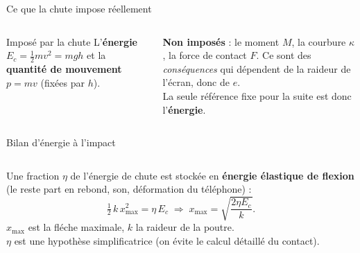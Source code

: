 \documentclass[11pt,aspectratio=169]{beamer}
\begin{document}
\begin{frame}{Ce que la chute impose réellement}
  \begin{columns}[c]
    \centering
    \footnotesize
    \begin{block}{Imposé par la chute}
    L'\textbf{énergie} $E_c=\tfrac12 mv^{2}=mgh$ et la \textbf{quantité de
    mouvement} $p=mv$ (fixées par $h$).
    \end{block}
    \textbf{Non imposés} : le moment $M$, la courbure $\kappa$, la force de
    contact $F$. Ce sont des \emph{conséquences} qui dépendent de la raideur de
    l'écran, donc de $e$.
    \medskip\\
    \textcolor{danger}{La seule référence fixe pour la suite est donc
    l'\textbf{énergie}.}
  \end{columns}
\end{frame}

\begin{frame}{Bilan d'énergie à l'impact}
  \begin{columns}[c]
    \centering
    \footnotesize
    Une fraction $\eta$ de l'énergie de chute est stockée en \textbf{énergie
    élastique de flexion} (le reste part en rebond, son, déformation du
    téléphone) :
    \[ \tfrac12\,k\,x_{\max}^{2}=\eta\,E_c
       \;\Rightarrow\; x_{\max}=\sqrt{\frac{2\eta E_c}{k}} . \]
    $x_{\max}$ est la fléche maximale, $k$ la raideur de la poutre.
    \medskip\\
    \textcolor{danger}{$\eta$ est une hypothèse simplificatrice (on évite le
    calcul détaillé du contact).}
  \end{columns}
\end{frame}
\end{document}
